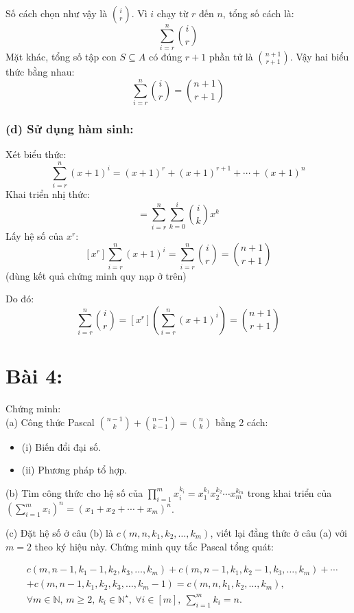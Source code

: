 \documentclass{article}
\begin{document}
	Số cách chọn như vậy là $\binom{i}{r}$. Vì $i$ chạy từ $r$ đến $n$, tổng số cách là:
	\[
	\sum_{i = r}^n \binom{i}{r}
	\]
	Mặt khác, tổng số tập con $S \subseteq A$ có đúng $r + 1$ phần tử là $\binom{n + 1}{r + 1}$. Vậy hai biểu thức bằng nhau:
	\[
	\sum_{i = r}^n \binom{i}{r} = \binom{n + 1}{r + 1}
	\]
	
	\subsubsection*{(d) Sử dụng hàm sinh:}
	
	Xét biểu thức:
	\[
	\sum_{i=r}^n (x + 1)^i = (x + 1)^r + (x + 1)^{r + 1} + \cdots + (x + 1)^n
	\]
	Khai triển nhị thức:
	\[
	= \sum_{i=r}^{n} \sum_{k=0}^{i} \binom{i}{k} x^k
	\]
	Lấy hệ số của $x^r$:
	\[
	[x^r] \sum_{i=r}^{n} (x + 1)^i = \sum_{i=r}^{n} \binom{i}{r} = \binom{n + 1}{r + 1}
	\]
	(dùng kết quả chứng minh quy nạp ở trên)
	
	Do đó:
	\[
	\sum_{i = r}^{n} \binom{i}{r} = [x^r] \left( \sum_{i=r}^{n} (x + 1)^i \right) = \binom{n + 1}{r + 1}
	\]
	
	\section*{Bài 4:}
	
	Chứng minh: \\
	(a) Công thức Pascal $\binom{n - 1}{k} + \binom{n - 1}{k - 1} = \binom{n}{k}$ bằng 2 cách: 
	
	\begin{itemize}
		\item (i) Biến đổi đại số.
		\item (ii) Phương pháp tổ hợp.
	\end{itemize}
	
	(b) Tìm công thức cho hệ số của $\prod_{i=1}^m x_i^{k_i} = x_1^{k_1}x_2^{k_2}\cdots x_m^{k_m}$ trong khai triển của $\left(\sum_{i=1}^m x_i\right)^n = (x_1 + x_2 + \cdots + x_m)^n$. 
	 
	 \vspace{1em}
	 
	(c) Đặt hệ số ở câu (b) là $c(m,n,k_1,k_2,\ldots,k_m)$, viết lại đẳng thức ở câu (a) với $m = 2$ theo ký hiệu này. Chứng minh quy tắc Pascal tổng quát:
	 
	{\footnotesize
		\begin{align*}
			&c(m,n - 1,k_1 - 1,k_2,k_3,\ldots,k_m) + c(m,n - 1,k_1,k_2 - 1,k_3,\ldots,k_m) + \cdots \\
			&+ c(m,n - 1,k_1,k_2,k_3,\ldots,k_m - 1) = c(m,n,k_1,k_2,\ldots,k_m), \\
			&\forall m\in\mathbb{N},\,m\ge2,\ k_i\in\mathbb{N}^\star,\ \forall i\in[m],\ \sum_{i=1}^m k_i = n.
		\end{align*}
	}
	
\end{document}
